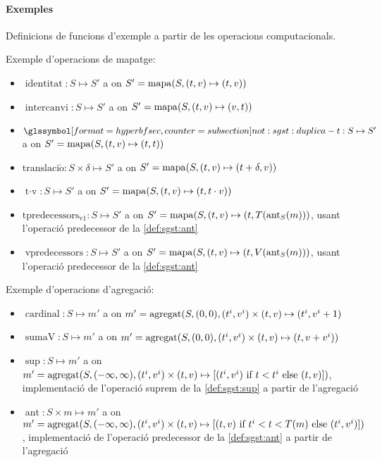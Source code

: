 \paragraph{Exemples} Definicions de funcions d'exemple a partir de les
operacions computacionals.

Exemple d'operacions de mapatge:
\begin{itemize}
\item $\operatorname{identitat}: S \mapsto S'$ a on $S'=
  \operatorname*{mapa}(S,(t,v)\mapsto(t,v))$
\item $\operatorname{intercanvi}: S \mapsto S'$ a on $S'=
  \operatorname*{mapa}(S,(t,v)\mapsto(v,t))$
\item $\glssymbolsec{not:sgst:duplica-t}: S \mapsto S'$ a on $S'=
  \operatorname*{mapa}(S,(t,v)\mapsto(t,t))$
\item $\operatorname{translaci\acute{o}}: S \times \delta \mapsto S'$ a on $S'=
  \operatorname*{mapa}(S,(t,v)\mapsto(t+\delta,v))$
\item $\operatorname{t\cdot v}: S \mapsto S'$ a on $S'=
  \operatorname*{mapa}(S,(t,v)\mapsto(t,t\cdot v))$
\item $\operatorname{tpredecessors_{v1}}: S \mapsto S'$ a on $S'= \operatorname*{mapa}(S,(t,v)
  \mapsto (t,T(\operatorname*{ant}_S(m)))$, usant l'operació predecessor de la
  \autoref{def:sgst:ant}
\item $\operatorname{vpredecessors}: S \mapsto S'$ a on $S'= \operatorname*{mapa}(S,(t,v)
  \mapsto (t,V(\operatorname*{ant}_S(m)))$, usant l'operació predecessor de la
  \autoref{def:sgst:ant}
\end{itemize}

Exemple d'operacions d'agregació:
\begin{itemize}
\item $\operatorname{cardinal}: S \mapsto m'$ a on $m'=
  \operatorname*{agregat}(S,(0,0),(t^i,v^i)\times(t,v)\mapsto(t^i,v^i+1)$
\item $\operatorname{sumaV}: S \mapsto m'$ a on $m'=
  \operatorname*{agregat}(S,(0,0),(t^i,v^i)\times(t,v)\mapsto(t,v+v^i))$
\item $\operatorname{sup}: S \mapsto m'$ a on $m'=
  \operatorname*{agregat}(S,(-\infty,\infty),(t^i,v^i)\times(t,v)\mapsto [(t^i,v^i)
  \text{ if } t < t^i \text{ else } (t,v) ])$, implementació de
  l'operació suprem de la \autoref{def:sgst:sup} a partir de
  l'agregació
\item $\operatorname{ant}: S \times m \mapsto m'$ a on $m'=
  \operatorname*{agregat}(S,(-\infty,\infty),(t^i,v^i)\times(t,v)\mapsto [(t,v)
  \text{ if } t^i < t < T(m) \text{ else } (t^i,v^i) ])$,
  implementació de l'operació predecessor de la \autoref{def:sgst:ant} a
  partir de l'agregació 
\end{itemize}


